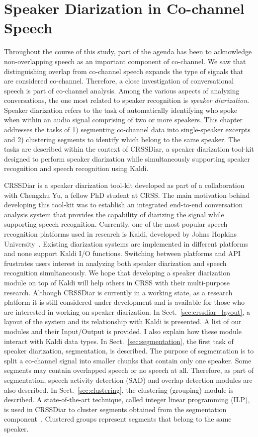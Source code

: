 
\chapter{Speaker Diarization in Co-channel Speech}
\label{chap:spkr_diar}

Throughout the course of this study, part of the agenda has been to acknowledge non-overlapping speech as an important component of co-channel. 
We saw that distinguishing overlap from co-channel speech expands the type of signals that are considered co-channel. 
Therefore, a close investigation of conversational speech is part of co-channel analysis. 
Among the various aspects of analyzing conversations, the one most related to speaker recognition is {\it speaker diarization}.
Speaker diarization refers to the task of automatically identifying who spoke when within an audio signal comprising of two or more speakers. 
This chapter addresses the tasks of 1) segmenting co-channel data into single-speaker excerpts and 2) clustering segments to identify which belong to the same speaker. 
The tasks are described within the context of CRSSDiar, a speaker diarization tool-kit designed to perform speaker diarization while simultaneously supporting speaker recognition and speech recognition using Kaldi\cite{kaldi}. 

CRSSDiar is a speaker diarization tool-kit developed as part of a collaboration with Chengzhu Yu, a fellow PhD student at CRSS. 
The main motivation behind developing this tool-kit was to establish an integrated end-to-end conversation analysis system that provides the capability of diarizing the signal while supporting speech recognition. 
Currently, one of the most popular speech recognition platforms used in research is Kaldi, developed by Johns Hopkins University~\cite{kaldi}. 
Existing diarization systems are implemented in different platforms and none support Kaldi I/O functions. 
Switching between platforms and API frustrates users interest in analyzing both speaker diarization and speech recognition simultaneously. 
We hope that developing a speaker diarization module on top of Kaldi will help others in CRSS with their multi-purpose research. 
Although CRSSDiar is currently in a working state, as a research platform it is still considered under development and is available for those who are interested in working on speaker diarization. 
In Sect.~\ref{sec:crssdiar_layout}, a layout of the system and its relationship with Kaldi is presented. 
A list of our modules and their Input/Output is provided. I also explain how these module interact with Kaldi data types. 
In Sect.~\ref{sec:segmentation}, the first task of speaker diarization, segmentation, is described. 
The purpose of segmentation is to split a co-channel signal into smaller chunks that contain only one speaker. 
Some segments may contain overlapped speech or no speech at all. 
Therefore, as part of segmentation, speech activity detection (SAD) and overlap detection modules are also described. 
In Sect.~\ref{sec:clustering}, the clustering (grouping) module is described. 
A state-of-the-art technique, called integer linear programming (ILP), is used in CRSSDiar to cluster segments obtained from the segmentation component~\cite{diarization_ilp}. 
Clustered groups represent segments that belong to the same speaker. 

